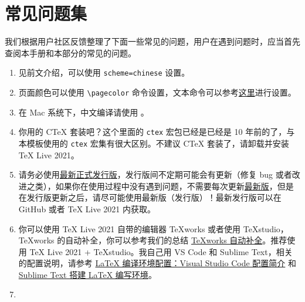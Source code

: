 \documentclass[cn,10pt,math=newtx,citestyle=gb7714-2015,bibstyle=gb7714-2015]{elegantbook}
\begin{document}
\chapter{常见问题集}

我们根据用户社区反馈整理了下面一些常见的问题，用户在遇到问题时，应当首先查阅本手册和本部分的常见的问题。

\begin{enumerate}[itemsep=1.5ex]
  \item {}
    见前文介绍，可以使用 \lstinline{scheme=chinese} 设置。
  \item {}
    页面颜色可以使用 \lstinline{\pagecolor} 命令设置，文本命令可以参考\href{https://tex.stackexchange.com/questions/278544/xcolor-what-is-the-equivalent-of-default-text-color}{这里}进行设置。
  \item {}
    在 Mac 系统下，中文编译请使用 。
  \item {}
    你用的 C\TeX{} 套装吧？这个里面的 \lstinline{ctex} 宏包已经是已经是 10 年前的了，与本模板使用的 \lstinline{ctex} 宏集有很大区别。不建议 C\TeX{} 套装了，请卸载并安装 \TeX{} Live 2021。
  \item {}
    请务必使用\href{https://github.com/ElegantLaTeX/ElegantBook/releases}{最新正式发行版}，发行版间不定期可能会有更新（修复 bug 或者改进之类），如果你在使用过程中没有遇到问题，不需要每次更新\href{https://github.com/ElegantLaTeX/ElegantBook/archive/master.zip}{最新版}，但是在发行版更新之后，请尽可能使用最新版（发行版）！最新发行版可以在 GitHub 或者 \TeX{} Live 2021 内获取。
  \item {}
    你可以使用 \TeX{} Live 2021 自带的编辑器 \TeX{}works 或者使用 \TeX{}studio，\TeX works 的自动补全，你可以参考我们的总结 \href{https://github.com/EthanDeng/texworks-autocomplete}{\TeX works 自动补全}。推荐使用 \TeX{} Live 2021 + \TeX{}studio。我自己用 VS Code 和 Sublime Text，相关的配置说明，请参考 \href{https://github.com/EthanDeng/vscode-latex}{\LaTeX{} 编译环境配置：Visual Studio Code 配置简介} 和 \href{https://github.com/EthanDeng/sublime-text-latex}{Sublime Text 搭建 \LaTeX{} 编写环境}。
  \item {}

\end{enumerate}
\end{document}
